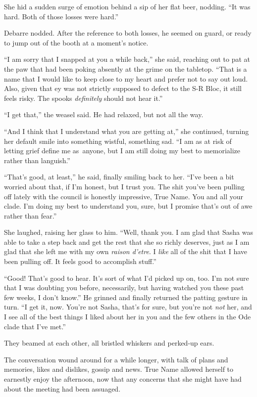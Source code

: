 She hid a sudden surge of emotion behind a sip of her flat beer, nodding. ``It was hard. Both of those losses were hard.''

Debarre nodded. After the reference to both losses, he seemed on guard, or ready to jump out of the booth at a moment's notice.

``I am sorry that I snapped at you a while back,'' she said, reaching out to pat at the paw that had been poking absently at the grime on the tabletop. ``That is a name that I would like to keep close to my heart and prefer not to say out loud. Also, given that ey was not strictly supposed to defect to the S-R Bloc, it still feels risky. The spooks \emph{definitely} should not hear it.''

``I get that,'' the weasel said. He had relaxed, but not all the way.

``And I think that I understand what you are getting at,'' she continued, turning her default smile into something wistful, something sad. ``I am as at risk of letting grief define me as\pagebreak\ anyone, but I am still doing my best to memorialize rather than languish.''

``That's good, at least,'' he said, finally smiling back to her. ``I've been a bit worried about that, if I'm honest, but I trust you. The shit you've been pulling off lately with the council is honestly impressive, True Name. You and all your clade. I'm doing my best to understand you, sure, but I promise that's out of awe rather than fear.''

She laughed, raising her glass to him. ``Well, thank you. I am glad that Sasha was able to take a step back and get the rest that she so richly deserves, just as I am glad that she left me with my own \emph{raison d'etre}. I \emph{like} all of the shit that I have been pulling off. It feels good to accomplish stuff.''

``Good! That's good to hear. It's sort of what I'd picked up on, too. I'm not sure that I was doubting you before, necessarily, but having watched you these past few weeks, I don't know.'' He grinned and finally returned the patting gesture in turn. ``I get it, now. You're not Sasha, that's for sure, but you're not \emph{not} her, and I see all of the best things I liked about her in you and the few others in the Ode clade that I've met.''

They beamed at each other, all bristled whiskers and perked-up ears.

The conversation wound around for a while longer, with talk of plans and memories, likes and dislikes, gossip and news. True Name allowed herself to earnestly enjoy the afternoon, now that any concerns that she might have had about the meeting had been assuaged.

